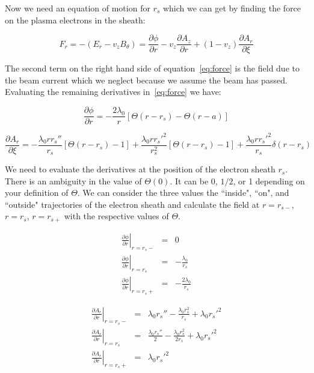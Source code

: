 \documentclass[aps,prl,preprint,groupedaddress]{revtex4-1}
\begin{document}
Now we need an equation of motion for $r_s$ which we can get by finding the force on the plasma electrons in the sheath:

\begin{equation}\label{eq:force}
F_r =-(E_r -v_z B_{\theta}) = \frac{\partial \phi}{\partial r} - v_z\frac{\partial A_z}{\partial r} + (1-v_z)\frac{\partial A_r}{\partial \xi}
\end{equation}

The second term on the right hand side of equation~\ref{eq:force} is the field due to the beam current which we neglect because we assume the beam has passed. Evaluating the remaining derivatives in~\ref{eq:force} we have:

\begin{equation}\label{dphi}
\frac{\partial \phi}{\partial r} = -\frac{2\lambda_0}{r}\left[\Theta(r-r_s)-\Theta(r-a)\right]
\end{equation}

\begin{equation}\label{dA_r}
\frac{\partial A_r}{\partial \xi} = -\frac{\lambda_0 r r_s''}{r_s}\left[\Theta(r-r_s)-1\right] + \frac{\lambda_0 r r_s'^2}{r_s^2}\left[\Theta(r-r_s)-1\right] + \frac{\lambda_0 r r_s'^2}{r_s}\delta(r-r_s)
\end{equation}

We need to evaluate the derivatives at the position of the electron sheath $r_s$. There is an ambiguity in the value of $\Theta(0)$. It can be 0, $1/2$, or 1 depending on your definition of $\Theta$. We can consider the three values the ``inside", ``on", and ``outside" trajectories of the electron sheath and calculate the field at $r=r_{s-}$,  $r=r_{s}$,  $r=r_{s+}$ with the respective values of $\Theta$.

\begin{equation}\label{eq:dphi_all}
\begin{array}{lcl}
\left.\frac{\partial \phi}{\partial r} \right|_{r=r_s-} & = & 0 \\
\left.\frac{\partial \phi}{\partial r} \right|_{r=r_s} & = & -\frac{\lambda_0}{r_s} \\
\left.\frac{\partial \phi}{\partial r} \right|_{r=r_s+} & = & -\frac{2\lambda_0}{r_s}
\end{array}
\end{equation}

\begin{equation}\label{eq:dA_r_all}
\begin{array}{lcl}
\left.\frac{\partial A_r}{\partial r} \right|_{r=r_s-} & = & \lambda_0 r_s'' - \frac{\lambda_0 r_s^2}{r_s} + \lambda_0 r_s'^2 \\
\left.\frac{\partial A_r}{\partial r} \right|_{r=r_s} & = & \frac{\lambda_0 r_s''}{2} - \frac{\lambda_0 r_s^2}{2 r_s} + \lambda_0 r_s'^2\\
\left.\frac{\partial A_r}{\partial r} \right|_{r=r_s+} & = & \lambda_0 r_s'^2
\end{array}
\end{equation}
\end{document}
